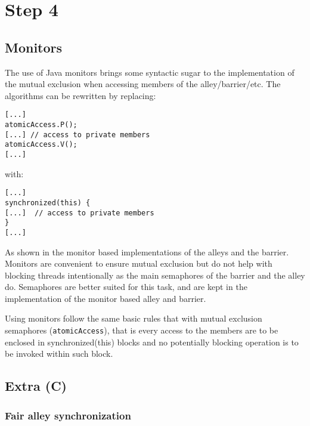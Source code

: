 
\section{Step 4}

\subsection{Monitors} %

The use of Java monitors brings some syntactic sugar to the implementation of
the mutual exclusion when accessing members of the alley/barrier/etc. The
algorithms can be rewritten by replacing:
\begin{verbatim}
[...]
atomicAccess.P();
[...] // access to private members
atomicAccess.V();
[...]
\end{verbatim}
with:
\begin{verbatim}
[...]
synchronized(this) {
[...]  // access to private members
}
[...]
\end{verbatim}

As shown in the monitor based implementations of the alleys and the barrier.
Monitors are convenient to ensure mutual exclusion but do not help with blocking
threads intentionally as the main semaphores of the barrier and the alley do.
Semaphores are better suited for this task, and are kept in the implementation
of the monitor based alley and barrier.

Using monitors follow the same basic rules that with mutual exclusion semaphores
(\texttt{atomicAccess}), that is every access to the members are to be enclosed
in synchronized(this) blocks and no potentially blocking operation is to be
invoked within such block.


\subsection{Extra (C)} %
\subsubsection{Fair alley synchronization}


